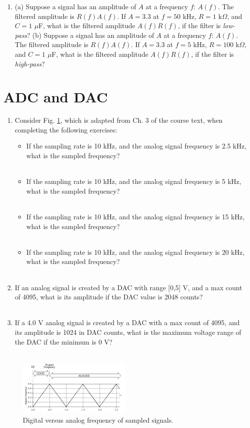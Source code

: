 \documentclass{article}
\begin{document}
\begin{enumerate}
\item (a) Suppose a signal has an amplitude of $A$ at a frequency $f$: $A(f)$.  The filtered amplitude is $R(f) A(f)$.  If $A=3.3$ at $f = 50$ kHz, $R = 1$ k$\Omega$, and $C = 1$ $\mu$F, what is the filtered amplitude $A(f) R(f)$, if the filter is \textit{low-pass}? (b) Suppose a signal has an amplitude of $A$ at a frequency $f$: $A(f)$.  The filtered amplitude is $R(f) A(f)$.  If $A=3.3$ at $f = 5$ kHz, $R = 100$ k$\Omega$, and $C = 1$ $\mu$F, what is the filtered amplitude $A(f) R(f)$, if the filter is \textit{high-pass}? \\ \vspace{4cm}
\end{enumerate}

\section{ADC and DAC}

\begin{enumerate}
\item Consider Fig. \ref{fig:1}, which is adapted from Ch. 3 of the course text, when completing the following exercises:
\small
\begin{itemize}
\item If the sampling rate is 10 kHz, and the analog signal frequency is 2.5 kHz, what is the sampled frequency? \\ \\
\item If the sampling rate is 10 kHz, and the analog signal frequency is 5 kHz, what is the sampled frequency? \\ \\
\item If the sampling rate is 10 kHz, and the analog signal frequency is 15 kHz, what is the sampled frequency? \\ \\
\item If the sampling rate is 10 kHz, and the analog signal frequency is 20 kHz, what is the sampled frequency? \\ \\
\end{itemize}
\normalsize
\item If an analog signal is created by a DAC with range [0,5] V, and a max count of 4095, what is its amplitude if the DAC value is 2048 counts? \\ \\
\item If a 4.0 V analog signal is created by a DAC with a max count of 4095, and its amplitude is 1024 in DAC counts, what is the maximum voltage range of the DAC if the minimum is 0 V? \\ \\
\end{enumerate}

\begin{figure}[hb]
\centering
\includegraphics[width=0.5\textwidth]{aliasing.png}
\caption{\label{fig:1} Digital versus analog frequency of sampled signals.}
\end{figure}
\end{document}

